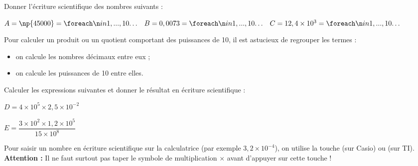 \documentclass[a4paper]{book}
\begin{document}
    
    \begin{exemple}
        Donner l'écriture scientifique des nombres suivants :

        \begin{center}
           $A = \np{45000} = \points[10] \quad B = 0,0073 = \points[10] \quad C = 12,4 \times 10^3 = \points[10]$ 
        \end{center}
    \end{exemple}


    \vspace{2cm}
    

    \begin{methode}
        Pour calculer un produit ou un quotient comportant des puissances de 10, il est astucieux de regrouper les termes :
        \begin{itemize}[label=\textbullet]
            \item on calcule les nombres décimaux entre eux ;
            \item on calcule les puissances de 10 entre elles.
        \end{itemize}
    \end{methode}
    
    
    \begin{exemple}
        Calculer les expressions suivantes et donner le résultat en écriture scientifique :

        \begin{minipage}[c]{0.45\textwidth}
            $D = 4 \times 10^5 \times 2,5 \times 10^{-2}$

            \vspace{5cm}
        \end{minipage}
        \hfill \vline \hfill
        \begin{minipage}[c]{0.5\textwidth}
            $E = \dfrac{3 \times 10^2 \times 1,2 \times 10^{5}}{15 \times 10^{8}}$

            \vspace{5cm}
        \end{minipage}   
    \end{exemple}
       
    
    \begin{remarque}
        Pour saisir un nombre en écriture scientifique sur la calculatrice (par exemple $3,2 \times 10^{-4}$), on utilise la touche  (sur Casio) ou  (sur TI). \\
        \textbf{Attention :} Il ne faut surtout pas taper le symbole de multiplication $\times$ avant d'appuyer sur cette touche !
    \end{remarque}
    
\end{document}
